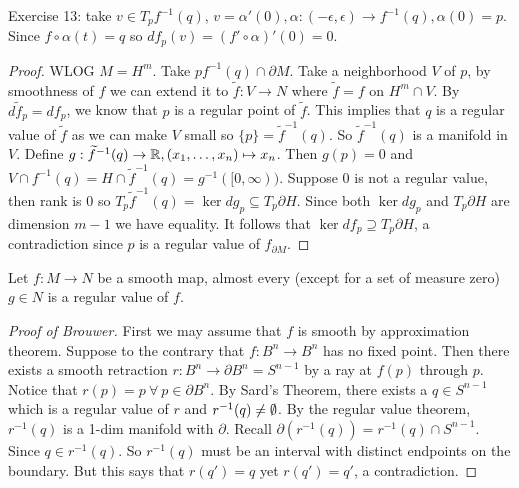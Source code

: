 \documentclass[12pt,class=article,crop=false]{standalone}
\begin{document}
Exercise 13: take $ v \in T_p f^{-1}(q)$, $ v = \alpha'(0), \alpha:(- \epsilon, \epsilon) \to f^{-1}(q), \alpha(0)=p$. Since $ f \circ \alpha(t) = q$ so $ df_p(v) = (f' \circ \alpha)'(0)=0$.
\begin{proof}
	WLOG $ M = H^{m}$. Take $ p f^{-1}(q) \cap \partial M$. Take a neighborhood $ V$ of  $ p$, by smoothness of  $ f$ we can extend it to  $ \widetilde{ f}: V \to N$ where $ \widetilde{ f} = f$ on $ H^{m} \cap V$. By $ d\widetilde{ f}_p = df_p$, we know that $ p$ is a regular point of  $ \widetilde{ f}$. This implies that $ q$ is a regular value of  $ \widetilde{ f}$ as we can make $ V$ small so $ \{p\} = \widetilde{ f}^{-1}(q)$. So $ \widetilde{ f}^{-1}(q)$ is a manifold in $ V$. Define  $ g:\widetilde{ f}^{-1}(q) \to \mathbb{R}, (x_1,\ldots,x_n)\mapsto x_n$. Then $ g(p)=0$ and  $ V \cap f^{-1}(q) = H \cap \widetilde{ f}^{-1}(q) = g^{-1}([0,\infty))$. Suppose $ 0$ is not a regular value, then rank is 0 so  $ T_p \widetilde{ f}^{-1}(q) = \ker dg _p \subseteq T_p \partial H$. Since both $ \ker dg_p $ and $ T_p \partial H$ are dimension $ m-1$ we have equality. It follows that $ \ker df_p \supseteq T_p \partial H$, a contradiction since $ p$ is a regular value of  $ f_{\partial M}$.
\end{proof}
\begin{thm}[Sard's]
Let $ f: M \to N$ be a smooth map, almost every  (except for a set of measure zero)$ g \in N$ is a regular value of $ f$.
\end{thm}

\begin{proof}[Proof of Brouwer]
First we may assume that $ f$ is smooth by approximation theorem. Suppose to the contrary that  $ f: B^{n} \to B^{n}$ has no fixed point. Then there exists a smooth retraction $ r: B^{n} \to \partial B^{n} = S^{n-1}$ by a ray at $ f(p)$ through $ p$. Notice that $ r(p)=p \ \forall \ p \in \partial B^{n}$. By Sard's Theorem, there exists a $ q \in S^{n-1}$ which is a regular value of $ r$ and $ r^{-1}(q) \neq \emptyset$. By the regular value theorem, $ r^{-1}(q)$ is a 1-dim manifold with $ \partial $. Recall $ \partial (r^{-1}(q)) = r^{-1}(q) \cap S^{n-1}$. Since $ q \in r^{-1}(q)$. So $ r^{-1}(q)$ must be an interval with distinct endpoints on the boundary. But this says that $r(q')=q $ yet  $ r(q')=q'$, a contradiction.
\end{proof}
\end{document}
